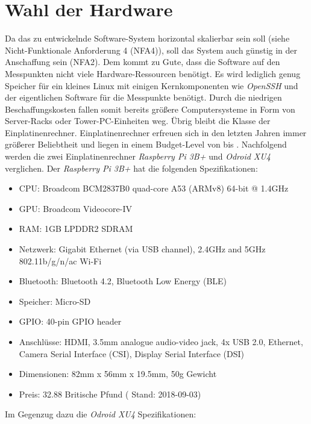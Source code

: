 \documentclass[titlepage]{report}
\begin{document}
\section{Wahl der Hardware}
Da das zu entwickelnde Software\hyp{}System horizontal skalierbar sein soll (siehe
Nicht-Funktionale Anforderung 4 (NFA4)), soll das System auch günstig in
der Anschaffung sein (NFA2). Dem kommt zu Gute, dass die Software auf den
Messpunkten nicht viele Hardware\hyp{}Ressourcen benötigt. Es wird
lediglich genug Speicher für ein kleines Linux mit einigen
Kernkomponenten wie \emph{OpenSSH} und der eigentlichen Software für die
Messpunkte benötigt. Durch die niedrigen Beschaffungskosten fallen somit
bereits größere Computersysteme in Form von Server\hyp{}Racks oder
Tower\hyp{}PC\hyp{}Einheiten weg. Übrig bleibt die Klasse der
Einplatinenrechner. Einplatinenrechner erfreuen sich in den letzten
Jahren immer größerer Beliebtheit und liegen in einem Budget\hyp{}Level
von  bis . Nachfolgend werden die zwei Einplatinenrechner
\emph{Raspberry Pi 3B+} und \emph{Odroid XU4} verglichen.
Der \emph{Raspberry Pi 3B+} hat die folgenden Spezifikationen\cite{RASPI}:
\begin{itemize}
    \item CPU: Broadcom BCM2837B0 quad-core A53 (ARMv8) 64-bit @ 1.4GHz
    \item GPU: Broadcom Videocore-IV
    \item RAM: 1GB LPDDR2 SDRAM
    \item Netzwerk: Gigabit Ethernet (via USB channel), 2.4GHz and 5GHz 802.11b/g/n/ac Wi-Fi
    \item Bluetooth: Bluetooth 4.2, Bluetooth Low Energy (BLE)
    \item Speicher: Micro-SD
    \item GPIO: 40-pin GPIO header
    \item Anschlüsse: HDMI, 3.5mm analogue audio-video jack, 4x USB 2.0, Ethernet, Camera Serial Interface
        (CSI), Display Serial Interface (DSI)
    \item Dimensionen: 82mm x 56mm x 19.5mm, 50g Gewicht
    \item Preis: 32.88 Britische Pfund\cite{RASPI_PRICE} ( Stand: 2018-09-03)
\end{itemize}
Im Gegenzug dazu die \emph{Odroid XU4} Spezifikationen\cite{ODROID}:
\end{document}
